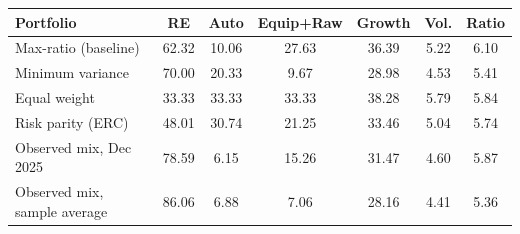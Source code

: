\begin{tabular}{lcccccc}
\toprule
\textbf{Portfolio} & RE & Auto & Equip+Raw & Growth & Vol. & Ratio \\
\midrule
Max-ratio (baseline) & 62.32 & 10.06 & 27.63 & 36.39 & 5.22 & 6.10 \\
Minimum variance & 70.00 & 20.33 & 9.67 & 28.98 & 4.53 & 5.41 \\
Equal weight & 33.33 & 33.33 & 33.33 & 38.28 & 5.79 & 5.84 \\
Risk parity (ERC) & 48.01 & 30.74 & 21.25 & 33.46 & 5.04 & 5.74 \\
Observed mix, Dec 2025 & 78.59 & 6.15 & 15.26 & 31.47 & 4.60 & 5.87 \\
Observed mix, sample average & 86.06 & 6.88 & 7.06 & 28.16 & 4.41 & 5.36 \\
\bottomrule
\end{tabular}

